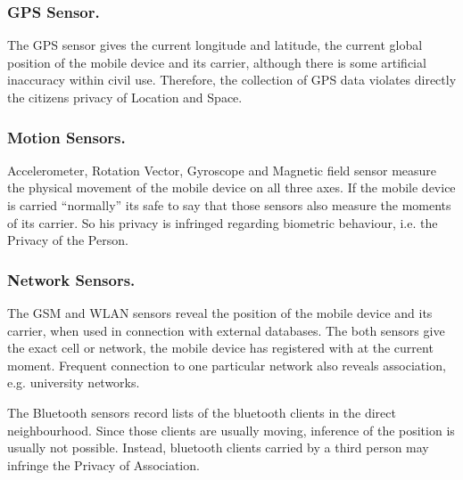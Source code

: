 \documentclass[runningheads,a4paper]{llncs}
\begin{document}
\subsubsection{GPS Sensor.}
The GPS sensor gives the current longitude and latitude, the current global position of the mobile device and its carrier, although there is some artificial inaccuracy within civil use. Therefore, the collection of GPS data violates directly the citizens privacy of Location and Space.


\subsubsection{Motion Sensors.}
Accelerometer, Rotation Vector, Gyroscope and Magnetic field sensor measure the physical movement of the mobile device on all three axes.
If the mobile device is carried ``normally'' its safe to say that those sensors also measure the moments of its carrier.
So his privacy is infringed regarding biometric behaviour, i.e. the Privacy of the Person.


\subsubsection{Network Sensors.}
The GSM and WLAN sensors reveal the position of the mobile device and its carrier, when used in connection with external databases.
The both sensors give the exact cell or network, the mobile device has registered with at the current moment.
Frequent connection to one particular network also reveals association, e.g. university networks.

The Bluetooth sensors record lists of the bluetooth clients in the direct neighbourhood.
Since those clients are usually moving, inference of the position is usually not possible.
Instead, bluetooth clients carried by a third person may infringe the Privacy of Association.

\end{document}
